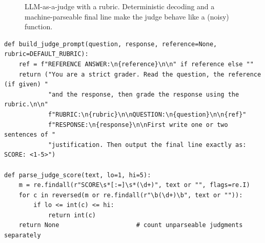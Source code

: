 \begin{figure}[t]
\centering
{}
\caption{LLM-as-a-judge with a rubric. Deterministic decoding and a machine-parseable final line
make the judge behave like a (noisy) function.}
\label{fig:eval:judge}
\end{figure}

\begin{lstlisting}[caption={Rubric prompt and robust score parsing (\texttt{llmsys/eval/judge.py}).},label={lst:eval:judgeprompt}]
def build_judge_prompt(question, response, reference=None, rubric=DEFAULT_RUBRIC):
    ref = f"REFERENCE ANSWER:\n{reference}\n\n" if reference else ""
    return ("You are a strict grader. Read the question, the reference (if given) "
            "and the response, then grade the response using the rubric.\n\n"
            f"RUBRIC:\n{rubric}\n\nQUESTION:\n{question}\n\n{ref}"
            f"RESPONSE:\n{response}\n\nFirst write one or two sentences of "
            "justification. Then output the final line exactly as: SCORE: <1-5>")

def parse_judge_score(text, lo=1, hi=5):
    m = re.findall(r"SCORE\s*[:=]\s*(\d+)", text or "", flags=re.I)
    for c in reversed(m or re.findall(r"\b(\d+)\b", text or "")):
        if lo <= int(c) <= hi:
            return int(c)
    return None                     # count unparseable judgments separately
\end{lstlisting}

